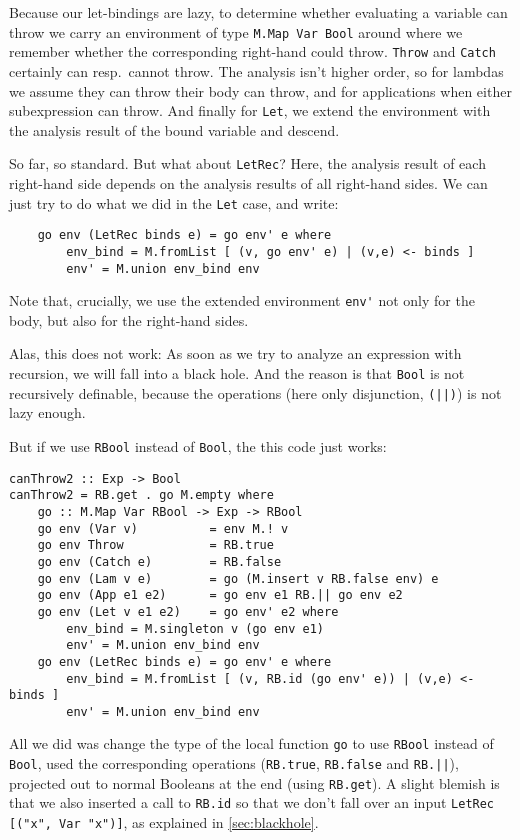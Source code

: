 \documentclass[manuscript,screen,acmsmall]{acmart}
\begin{document}
Because our let-bindings are lazy, to determine whether evaluating a variable can throw we carry an environment of type \verb|M.Map Var Bool| around where we remember whether the corresponding right-hand could throw. \verb|Throw| and \verb|Catch| certainly can resp.\ cannot throw. The analysis isn't higher order, so for lambdas we assume they can throw their body can throw, and for applications when either subexpression can throw. And finally for \verb|Let|, we extend the environment with the analysis result of the bound variable and descend.

So far, so standard. But what about \verb|LetRec|? Here, the analysis result of each right-hand side depends on the analysis results of all right-hand sides. We can just try to do what we did in the \verb|Let| case, and write:
\begin{verbatim}
    go env (LetRec binds e) = go env' e where
        env_bind = M.fromList [ (v, go env' e) | (v,e) <- binds ]
        env' = M.union env_bind env
\end{verbatim}
Note that, crucially, we use the extended environment \verb|env'| not only for the body, but also for the right-hand sides.

Alas, this does not work: As soon as we try to analyze an expression with recursion, we will fall into a black hole. And the reason is that \verb|Bool| is not recursively definable, because the operations (here only disjunction, \verb+(||)+) is not lazy enough.

But if we use \verb|RBool| instead of \verb|Bool|, the this code just works:
\begin{verbatim}
canThrow2 :: Exp -> Bool
canThrow2 = RB.get . go M.empty where
    go :: M.Map Var RBool -> Exp -> RBool
    go env (Var v)          = env M.! v
    go env Throw            = RB.true
    go env (Catch e)        = RB.false
    go env (Lam v e)        = go (M.insert v RB.false env) e
    go env (App e1 e2)      = go env e1 RB.|| go env e2
    go env (Let v e1 e2)    = go env' e2 where
        env_bind = M.singleton v (go env e1)
        env' = M.union env_bind env
    go env (LetRec binds e) = go env' e where
        env_bind = M.fromList [ (v, RB.id (go env' e)) | (v,e) <- binds ]
        env' = M.union env_bind env
\end{verbatim}
All we did was change the type of the local function \verb|go| to use \verb|RBool| instead of \verb|Bool|, used the corresponding operations (\verb|RB.true|, \verb|RB.false| and \verb+RB.||+), projected out to normal Booleans at the end (using \verb|RB.get|). A slight blemish is that we also inserted a call to \verb|RB.id| so that we don't fall over an input \verb|LetRec [("x", Var "x")]|, as explained in \cref{sec:blackhole}.
\end{document}
